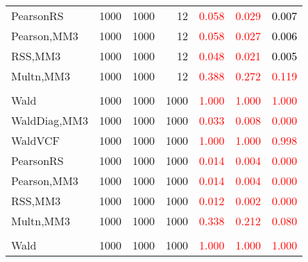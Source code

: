 \documentclass[
]{article}
\begin{document}
\begin{table}[H]
{\begin{tabular}[t]{lrrrrrr}
\hspace{1em}PearsonRS & 1000 & 1000 & 12 & \textcolor{red}{0.058} & \textcolor{red}{0.029} & \textcolor{black}{0.007}\\
\hspace{1em}Pearson,MM3 & 1000 & 1000 & 12 & \textcolor{red}{0.058} & \textcolor{red}{0.027} & \textcolor{black}{0.006}\\
\hspace{1em}RSS,MM3 & 1000 & 1000 & 12 & \textcolor{red}{0.048} & \textcolor{red}{0.021} & \textcolor{black}{0.005}\\
\hspace{1em}Multn,MM3 & 1000 & 1000 & 12 & \textcolor{red}{0.388} & \textcolor{red}{0.272} & \textcolor{red}{0.119}\\
\addlinespace[0.3em]
\multicolumn{7}{l}{\textbf{1F 15V}}\\
\hspace{1em}Wald & 1000 & 1000 & 1000 & \textcolor{red}{1.000} & \textcolor{red}{1.000} & \vphantom{2} \textcolor{red}{1.000}\\
\hspace{1em}WaldDiag,MM3 & 1000 & 1000 & 1000 & \textcolor{red}{0.033} & \textcolor{red}{0.008} & \textcolor{red}{0.000}\\
\hspace{1em}WaldVCF & 1000 & 1000 & 1000 & \textcolor{red}{1.000} & \textcolor{red}{1.000} & \textcolor{red}{0.998}\\
\hspace{1em}PearsonRS & 1000 & 1000 & 1000 & \textcolor{red}{0.014} & \textcolor{red}{0.004} & \textcolor{red}{0.000}\\
\hspace{1em}Pearson,MM3 & 1000 & 1000 & 1000 & \textcolor{red}{0.014} & \textcolor{red}{0.004} & \textcolor{red}{0.000}\\
\hspace{1em}RSS,MM3 & 1000 & 1000 & 1000 & \textcolor{red}{0.012} & \textcolor{red}{0.002} & \textcolor{red}{0.000}\\
\hspace{1em}Multn,MM3 & 1000 & 1000 & 1000 & \textcolor{red}{0.338} & \textcolor{red}{0.212} & \textcolor{red}{0.080}\\
\addlinespace[0.3em]
\multicolumn{7}{l}{\textbf{2F 10V}}\\
\hspace{1em}Wald & 1000 & 1000 & 1000 & \textcolor{red}{1.000} & \textcolor{red}{1.000} & \vphantom{1} \textcolor{red}{1.000}\\

\end{tabular}}
\end{table}
\end{document}
